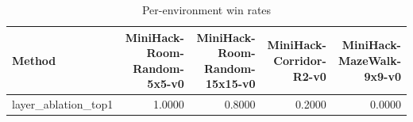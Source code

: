 \begin{table}[htbp]
\centering
\caption{Per-environment win rates}
\label{tab:per-env}
\begin{tabular}{lrrrr}
\toprule
\textbf{Method} & \textbf{MiniHack-Room-Random-5x5-v0} & \textbf{MiniHack-Room-Random-15x15-v0} & \textbf{MiniHack-Corridor-R2-v0} & \textbf{MiniHack-MazeWalk-9x9-v0} \\
\midrule
layer\_ablation\_top1 & 1.0000 & 0.8000 & 0.2000 & 0.0000 \\
\bottomrule
\end{tabular}
\end{table}